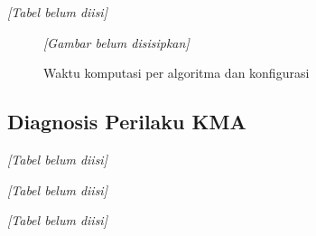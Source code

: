         \begin{table}[H]
            \centering
            \caption{Waktu komputasi satu proses dan enam worker}\label{tab:computation time}
            \textit{[Tabel belum diisi]}
        \end{table}

        \begin{figure}[H]
            \centering
            \textit{[Gambar belum disisipkan]}
            \caption{Waktu komputasi per algoritma dan konfigurasi}\label{fig:computation time}
        \end{figure}

        \subsection{Diagnosis Perilaku KMA}\label{subsec:kma diagnosis}

        \begin{table}[H]
            \centering
            \caption{Ringkasan per fase KMA: generasi, penerimaan Big Male, dan norma langkah}\label{tab:kma phase}
            \textit{[Tabel belum diisi]}
        \end{table}

        \begin{table}[H]
            \centering
            \caption{Profil waktu KMA, GA, dan PSO}\label{tab:kma profile}
            \textit{[Tabel belum diisi]}
        \end{table}

        \begin{table}[H]
            \centering
            \caption{Ablasi varian KMA terhadap konfigurasi default}\label{tab:kma ablation}
            \textit{[Tabel belum diisi]}
        \end{table}

